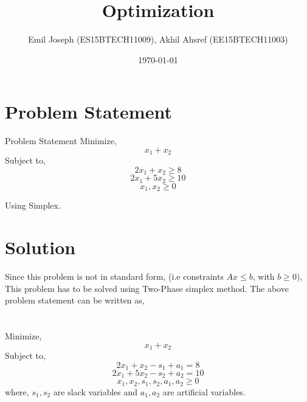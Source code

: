 \documentclass{beamer}
\title[Your Short Title]{Optimization}
\author{Emil Joseph (ES15BTECH11009), Akhil Ahsref (EE15BTECH11003)}
\institute{IITH}
\date{\today}
\begin{document}
\begin{frame}
  \titlepage
\end{frame}


\section{Problem Statement}

\begin{frame}{Problem Statement}
Minimize, \\
$$x_{1} + x_{2}$$
Subject to,
\begin{equation*}
    2x_{1} + x_{2} \geq 8 
\end{equation*}
\begin{equation*}
    2x_{1} + 5x_{2} \geq 10 
\end{equation*}
\begin{equation*}
    x_{1},x_{2} \geq 0 
\end{equation*}

Using Simplex.

\end{frame}

\section{Solution}
\begin{frame}{}
    Since this problem is not in standard form, (i.e constraints $Ax \leq b$, with $b  \geq 0 $), This problem has to be solved using Two-Phase simplex method. The above problem statement can be written as,\\ \\ \\
    Minimize, \\
$$x_{1} + x_{2}$$
Subject to,
\begin{equation*}
    2x_{1} + x_{2} - s_{1} + a_{1} = 8 
\end{equation*}
\begin{equation*}
    2x_{1} + 5x_{2} - s_{2} + a_{2} = 10 
\end{equation*}
\begin{equation*}
    x_{1},x_{2},s_{1},s_{2},a_{1},a_{2} \geq 0 
\end{equation*}
where, $s_{1}, s_{2}$ are slack variables and $a_{1},a_{2}$ are artificial variables.
\end{frame}
\end{document}
